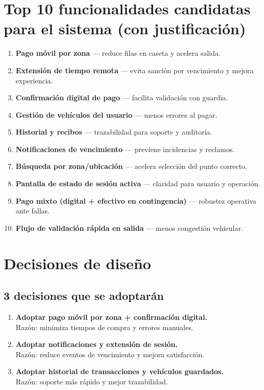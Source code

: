 \documentclass[11pt]{article}
\begin{document}
\section{Top 10 funcionalidades candidatas para el sistema (con justificación)}
\begin{enumerate}
\item \textbf{Pago móvil por zona} --- reduce filas en caseta y acelera salida.
\item \textbf{Extensión de tiempo remota} --- evita sanción por vencimiento y mejora experiencia.
\item \textbf{Confirmación digital de pago} --- facilita validación con guardia.
\item \textbf{Gestión de vehículos del usuario} --- menos errores al pagar.
\item \textbf{Historial y recibos} --- trazabilidad para soporte y auditoría.
\item \textbf{Notificaciones de vencimiento} --- previene incidencias y reclamos.
\item \textbf{Búsqueda por zona/ubicación} --- acelera selección del punto correcto.
\item \textbf{Pantalla de estado de sesión activa} --- claridad para usuario y operación.
\item \textbf{Pago mixto (digital + efectivo en contingencia)} --- robustez operativa ante fallas.
\item \textbf{Flujo de validación rápida en salida} --- menos congestión vehicular.
\end{enumerate}

\section{Decisiones de diseño}
\subsection*{3 decisiones que se adoptarán}
\begin{enumerate}
\item \textbf{Adoptar pago móvil por zona + confirmación digital.}\\
Razón: minimiza tiempos de compra y errores manuales.
\item \textbf{Adoptar notificaciones y extensión de sesión.}\\
Razón: reduce eventos de vencimiento y mejora satisfacción.
\item \textbf{Adoptar historial de transacciones y vehículos guardados.}\\
Razón: soporte más rápido y mejor trazabilidad.
\end{enumerate}
\end{document}

